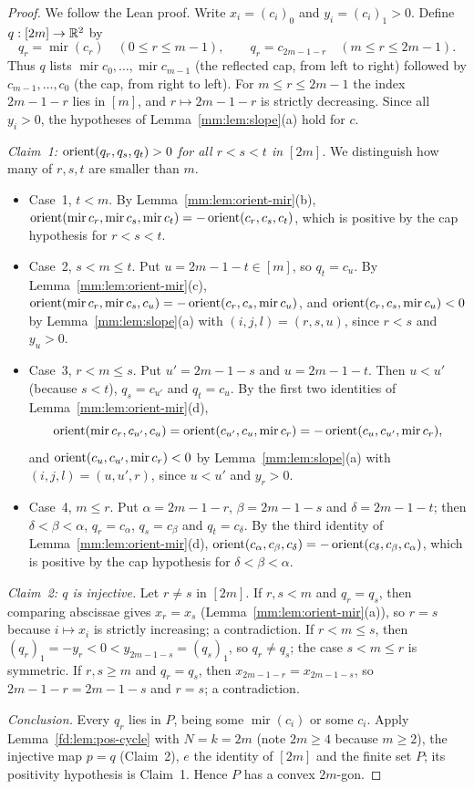 \begin{proof}
We follow the Lean proof. Write $x_i=(c_i)_0$ and $y_i=(c_i)_1>0$. Define $q:[2m]\to\mathbb R^2$ by
\[ q_r=\operatorname{mir}(c_r)\quad(0\le r\le m-1),\qquad q_r=c_{2m-1-r}\quad(m\le r\le 2m-1). \]
Thus $q$ lists $\operatorname{mir}c_0,\dots,\operatorname{mir}c_{m-1}$ (the reflected cap, from left to
right) followed by $c_{m-1},\dots,c_0$ (the cap, from right to left). For $m\le r\le 2m-1$ the index
$2m-1-r$ lies in $[m]$, and $r\mapsto2m-1-r$ is strictly decreasing. Since all $y_i>0$, the hypotheses
of Lemma~\ref{mm:lem:slope}(a) hold for $c$.

\emph{Claim~1: $\operatorname{orient}(q_r,q_s,q_t)>0$ for all $r<s<t$ in $[2m]$.} We distinguish how many of $r,s,t$
are smaller than $m$.
\begin{itemize}
\item Case~1, $t<m$. By Lemma~\ref{mm:lem:orient-mir}(b),
  $\operatorname{orient}(\operatorname{mir}c_r,\operatorname{mir}c_s,\operatorname{mir}c_t)=-\operatorname{orient}(c_r,c_s,c_t)$, which
  is positive by the cap hypothesis for $r<s<t$.
\item Case~2, $s<m\le t$. Put $u=2m-1-t\in[m]$, so $q_t=c_u$. By Lemma~\ref{mm:lem:orient-mir}(c),
  $\operatorname{orient}(\operatorname{mir}c_r,\operatorname{mir}c_s,c_u)=-\operatorname{orient}(c_r,c_s,\operatorname{mir}c_u)$, and
  $\operatorname{orient}(c_r,c_s,\operatorname{mir}c_u)<0$ by Lemma~\ref{mm:lem:slope}(a) with $(i,j,l)=(r,s,u)$, since
  $r<s$ and $y_u>0$.
\item Case~3, $r<m\le s$. Put $u'=2m-1-s$ and $u=2m-1-t$. Then $u<u'$ (because $s<t$), $q_s=c_{u'}$ and
  $q_t=c_u$. By the first two identities of Lemma~\ref{mm:lem:orient-mir}(d),
  \[ \operatorname{orient}(\operatorname{mir}c_r,c_{u'},c_u)=\operatorname{orient}(c_{u'},c_u,\operatorname{mir}c_r)
     =-\operatorname{orient}(c_u,c_{u'},\operatorname{mir}c_r), \]
  and $\operatorname{orient}(c_u,c_{u'},\operatorname{mir}c_r)<0$ by Lemma~\ref{mm:lem:slope}(a) with $(i,j,l)=(u,u',r)$,
  since $u<u'$ and $y_r>0$.
\item Case~4, $m\le r$. Put $\alpha=2m-1-r$, $\beta=2m-1-s$ and $\delta=2m-1-t$; then
  $\delta<\beta<\alpha$, $q_r=c_\alpha$, $q_s=c_\beta$ and $q_t=c_\delta$. By the third identity of
  Lemma~\ref{mm:lem:orient-mir}(d), $\operatorname{orient}(c_\alpha,c_\beta,c_\delta)=-\operatorname{orient}(c_\delta,c_\beta,c_\alpha)$,
  which is positive by the cap hypothesis for $\delta<\beta<\alpha$.
\end{itemize}

\emph{Claim~2: $q$ is injective.} Let $r\ne s$ in $[2m]$. If $r,s<m$ and $q_r=q_s$, then comparing
abscissae gives $x_r=x_s$ (Lemma~\ref{mm:lem:orient-mir}(a)), so $r=s$ because $i\mapsto x_i$ is strictly
increasing; a contradiction. If $r<m\le s$, then $(q_r)_1=-y_r<0<y_{2m-1-s}=(q_s)_1$, so $q_r\ne q_s$; the
case $s<m\le r$ is symmetric. If $r,s\ge m$ and $q_r=q_s$, then $x_{2m-1-r}=x_{2m-1-s}$, so
$2m-1-r=2m-1-s$ and $r=s$; a contradiction.

\emph{Conclusion.} Every $q_r$ lies in $P$, being some $\operatorname{mir}(c_i)$ or some $c_i$. Apply
Lemma~\ref{fd:lem:pos-cycle} with $N=k=2m$ (note $2m\ge4$ because $m\ge2$), the injective map $p=q$
(Claim~2), $e$ the identity of $[2m]$ and the finite set $P$; its positivity hypothesis is Claim~1. Hence
$P$ has a convex $2m$-gon.
\end{proof}

